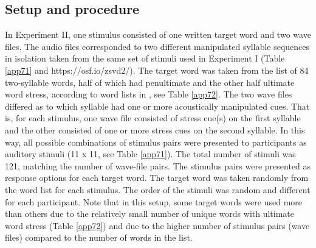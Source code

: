 \subsection{Setup and procedure} \label{sec332}
In Experiment II, one stimulus consisted of one written target word and two wave files. The audio files corresponded to two different manipulated syllable sequences in isolation taken from the same set of stimuli used in Experiment I (Table \ref{app71} and https://osf.io/zsvd2/). The target word was taken from the list of 84 two-syllable words, half of which had penultimate and the other half ultimate word stress, according to word lists in \citet{kluge_grammar_2017}, see Table \ref{app72}. The two wave files differed as to which syllable had one or more acoustically manipulated cues. That is, for each stimulus, one wave file consisted of stress cue(s) on the first syllable and the other consisted of one or more stress cues on the second syllable. In this way, all possible combinations of stimulus pairs were presented to participants as auditory stimuli (11 x 11, see Table \ref{app71}). The total number of stimuli was 121, matching the number of wave-file pairs. The stimulus pairs were presented as response options for each target word. The target word was taken randomly from the word list for each stimulus. The order of the stimuli was random and different for each participant. Note that in this setup, some target words were used more than others due to the relatively small number of unique words with ultimate word stress (Table \ref{app72}) and due to the higher number of stimulus pairs (wave files) compared to the number of words in the list.

